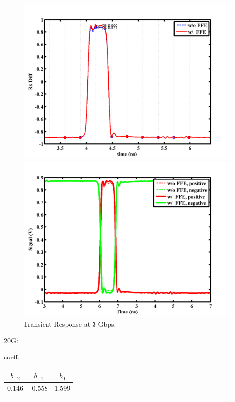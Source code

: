 \documentclass{book}  %
\begin{document}
\begin{paper}
\begin{figure}[htbp!]
\begin{minipage}[tb]{0.5\textwidth}
		\centering	
		\includegraphics[width=\textwidth]{./img/Verilog/3G/2_diff.png}
		\subcaption{}
	\end{minipage}%
	\begin{minipage}[tb]{0.5\textwidth}
		\centering	
		\includegraphics[width=\textwidth]{./img/Verilog/3G/2.png}
		\subcaption{}
	\end{minipage}
	\caption{Transient Response at 3 Gbps.}
\end{figure}

20G: 


coeff.
\begin{tabular}{|c|c|c|}\hline
	$b_{-2}$ & $b_{-1}$ &  $b_{0}$ \\ \hline 
	0.146 &   -0.558 &    1.599 \\ \hline
	\label{table:20G_FFE_coeff} 
\end{tabular}


\end{paper}
\end{document}

